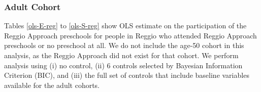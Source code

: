 %

%


\subsubsection{Adult Cohort}
Tables \ref{ols-E-reg} to \ref{ols-S-reg} show OLS estimate on the participation of the Reggio Approach preschools for people in Reggio who attended Reggio Approach preschools or no preschool at all. We do not include the age-50 cohort in this analysis, as the Reggio Approach did not exist for that cohort. We perform analysis using (i) no control, (ii) 6 controls selected by Bayesian Information Criterion (BIC), and (iii) the full set of controls that include baseline variables available for the adult cohorts. 

